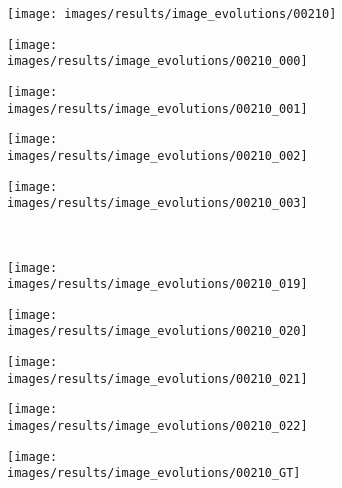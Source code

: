 \begin{figure}[t]
 \begin{subfigure}[c]{0.19\textwidth}
  \centering
  \texttt{[image: images/results/image\_evolutions/00210]}
 \end{subfigure}
 \begin{subfigure}[c]{0.19\textwidth}
  \centering
  \texttt{[image: images/results/image\_evolutions/00210\_000]}
 \end{subfigure}
 \begin{subfigure}[c]{0.19\textwidth}
  \centering
  \texttt{[image: images/results/image\_evolutions/00210\_001]}
 \end{subfigure}
 \begin{subfigure}[c]{0.19\textwidth}
  \centering
  \texttt{[image: images/results/image\_evolutions/00210\_002]}
 \end{subfigure}
 \begin{subfigure}[c]{0.19\textwidth}
  \centering
  \texttt{[image: images/results/image\_evolutions/00210\_003]}
 \end{subfigure}
 \\
 \begin{subfigure}[c]{0.19\textwidth}
  \centering
  \texttt{[image: images/results/image\_evolutions/00210\_019]}
 \end{subfigure}
 \begin{subfigure}[c]{0.19\textwidth}
  \centering
  \texttt{[image: images/results/image\_evolutions/00210\_020]}
 \end{subfigure}
 \begin{subfigure}[c]{0.19\textwidth}
  \centering
  \texttt{[image: images/results/image\_evolutions/00210\_021]}
 \end{subfigure}
 \begin{subfigure}[c]{0.19\textwidth}
  \centering
  \texttt{[image: images/results/image\_evolutions/00210\_022]}
 \end{subfigure}
 \begin{subfigure}[c]{0.19\textwidth}
  \centering
  \texttt{[image: images/results/image\_evolutions/00210\_GT]}
 \end{subfigure}
 \\
 

\end{figure}
